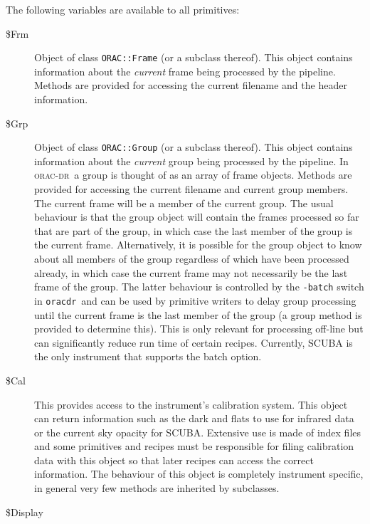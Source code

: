 \documentclass[twoside,11pt]{article}
\renewcommand{\_}{\texttt{\symbol{95}}}
\newcommand{\Oracdr}{\textsc{orac-dr}}
\newcommand{\oracdr}{\texttt{oracdr}}
\begin{document}
The following variables are available to all primitives:

\begin{description}
\item[\$Frm] \mbox{} %

  Object of class \texttt{ORAC::Frame} (or a subclass thereof). This
object contains information about the \emph{current} frame being
processed by the pipeline. Methods are provided for accessing the
current filename and the header information.

\item[\$Grp] \mbox{} %

Object of class \texttt{ORAC::Group} (or a subclass thereof). This
object contains information about the \emph{current} group being
processed by the pipeline. In \Oracdr\ a group is thought of as an
array of frame objects. Methods are provided for accessing the current
filename and current group members. The current frame will be a member
of the current group. The usual behaviour is that the group object
will contain the frames processed so far that are part of the group,
in which case the last member of the group is the current frame.
Alternatively, it is possible for the group object to know about all
members of the group regardless of which have been processed already,
in which case the current frame may not necessarily be the last frame of
the group. The latter behaviour is controlled by the \texttt{-batch}
switch in \oracdr\ and can be used by primitive writers to delay group 
processing until the current frame is the last member of the group (a
group method is provided to determine this). This is only relevant for 
processing off-line but can significantly reduce run time of certain
recipes. Currently, SCUBA is the
only instrument that supports the batch option.

\item[\$Cal] \mbox{} %

This provides access to the instrument's calibration system. This object
can return information such as the dark and flats to use for infrared
data or the current sky opacity for SCUBA. Extensive use is made of
index files and some primitives and recipes  must be responsible
for filing calibration data with this object so that later recipes
can access the correct information. The behaviour of this object is 
completely instrument specific, in general very few methods are
inherited by subclasses.

\item[\$Display] \mbox{} %


\end{description}
\end{document}
